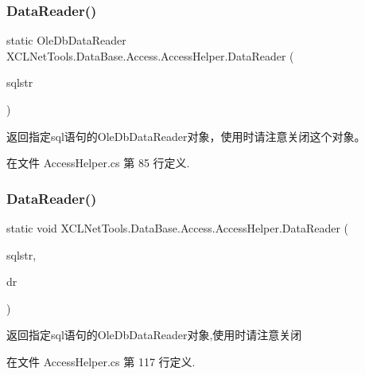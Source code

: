 \subsubsection{\texorpdfstring{Data\+Reader()}{DataReader()}\hspace{0.1cm}{\footnotesize\ttfamily [1/2]}}
{\footnotesize\ttfamily static Ole\+Db\+Data\+Reader X\+C\+L\+Net\+Tools.\+Data\+Base.\+Access.\+Access\+Helper.\+Data\+Reader (\begin{DoxyParamCaption}\item[{string}]{sqlstr }\end{DoxyParamCaption})\hspace{0.3cm}{\ttfamily [static]}}



返回指定sql语句的\+Ole\+Db\+Data\+Reader对象，使用时请注意关闭这个对象。 



在文件 Access\+Helper.\+cs 第 85 行定义.

\mbox{\label{class_x_c_l_net_tools_1_1_data_base_1_1_access_1_1_access_helper_a1eb9b1ca36a5bd3ea1a3b28d3196f826}} 
\subsubsection{\texorpdfstring{Data\+Reader()}{DataReader()}\hspace{0.1cm}{\footnotesize\ttfamily [2/2]}}
{\footnotesize\ttfamily static void X\+C\+L\+Net\+Tools.\+Data\+Base.\+Access.\+Access\+Helper.\+Data\+Reader (\begin{DoxyParamCaption}\item[{string}]{sqlstr,  }\item[{ref Ole\+Db\+Data\+Reader}]{dr }\end{DoxyParamCaption})\hspace{0.3cm}{\ttfamily [static]}}



返回指定sql语句的\+Ole\+Db\+Data\+Reader对象,使用时请注意关闭 



在文件 Access\+Helper.\+cs 第 117 行定义.

